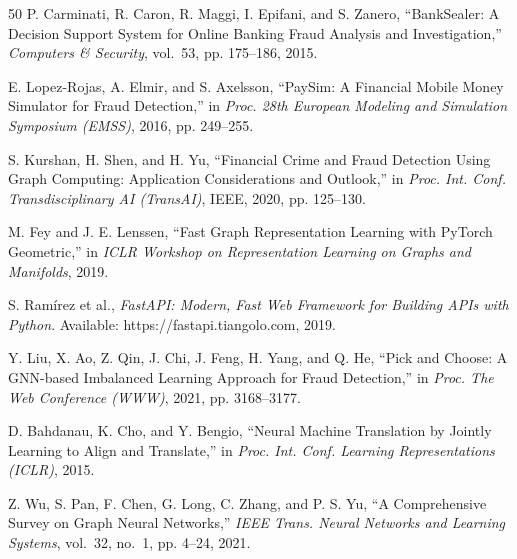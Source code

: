 \documentclass[conference]{IEEEtran}
\begin{document}
\begin{thebibliography}{50}
P. Carminati, R. Caron, R. Maggi, I. Epifani, and S. Zanero, ``BankSealer: A Decision Support System for Online Banking Fraud Analysis and Investigation,'' \textit{Computers \& Security}, vol.~53, pp. 175--186, 2015.

E. Lopez-Rojas, A. Elmir, and S. Axelsson, ``PaySim: A Financial Mobile Money Simulator for Fraud Detection,'' in \textit{Proc. 28th European Modeling and Simulation Symposium (EMSS)}, 2016, pp. 249--255.

S. Kurshan, H. Shen, and H. Yu, ``Financial Crime and Fraud Detection Using Graph Computing: Application Considerations and Outlook,'' in \textit{Proc. Int. Conf. Transdisciplinary AI (TransAI)}, IEEE, 2020, pp. 125--130.

M. Fey and J. E. Lenssen, ``Fast Graph Representation Learning with PyTorch Geometric,'' in \textit{ICLR Workshop on Representation Learning on Graphs and Manifolds}, 2019.

S. Ram\'{i}rez et al., \textit{FastAPI: Modern, Fast Web Framework for Building APIs with Python}. Available: https://fastapi.tiangolo.com, 2019.

Y. Liu, X. Ao, Z. Qin, J. Chi, J. Feng, H. Yang, and Q. He, ``Pick and Choose: A GNN-based Imbalanced Learning Approach for Fraud Detection,'' in \textit{Proc. The Web Conference (WWW)}, 2021, pp. 3168--3177.

D. Bahdanau, K. Cho, and Y. Bengio, ``Neural Machine Translation by Jointly Learning to Align and Translate,'' in \textit{Proc. Int. Conf. Learning Representations (ICLR)}, 2015.

Z. Wu, S. Pan, F. Chen, G. Long, C. Zhang, and P. S. Yu, ``A Comprehensive Survey on Graph Neural Networks,'' \textit{IEEE Trans. Neural Networks and Learning Systems}, vol.~32, no.~1, pp. 4--24, 2021.

\end{thebibliography}
\end{document}
